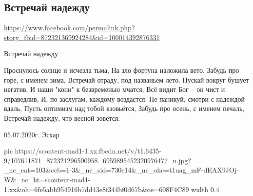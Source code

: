  
 
 
 
 

\subsection{Встречай надежду}
\label{sec:05_06_2020.fb.1.nadezhda_stihi}
\url{https://www.facebook.com/permalink.php?story_fbid=872321369924284&id=100014392876331}

Встречай надежду

Проснулось солнце и исчезла тьма,
На зло фортуна наложила вето,
Забудь про горе, с именем зима,
Встречай отраду, под названьем лето.
Пускай вокруг бушует негатив,
И наши "кони" к безвременью мчатся,
Всё видит Бог – он чист и справедлив,
И, по заслугам, каждому воздастся.
Не паникуй, смотри с надеждой вдаль,
Пусть оптимизм над тобой взовьётся,
Забудь про осень, с именем печаль,
Встречай надежду, что весной зовётся.

05.07.2020г. Эсхар

\ifcmt
  pic https://scontent-mad1-1.xx.fbcdn.net/v/t1.6435-9/107611871_872321296590958_6959895452320976477_n.jpg?_nc_cat=103&ccb=1-3&_nc_sid=730e14&_nc_ohc=t1uag_mF-dEAX9JOj-W&_nc_ht=scontent-mad1-1.xx&oh=6fe5abb954916b7dd43e8f344bf0d67b&oe=608F4C89
  width 0.4
\fi

